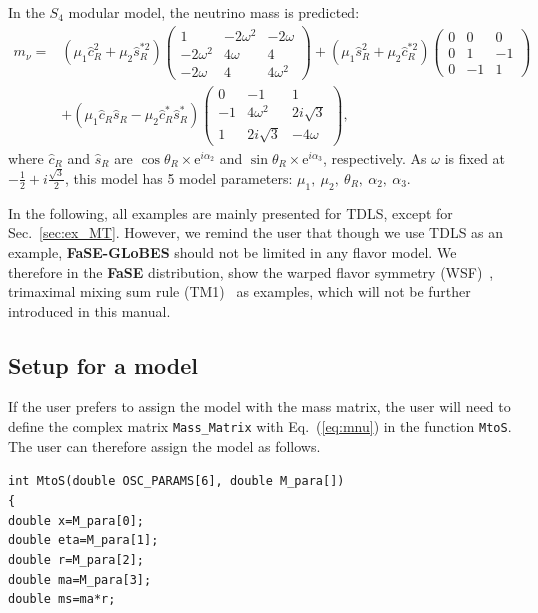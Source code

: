 \documentclass[aps,prd,nofootinbib,preprint]{revtex4}
\begin{document}
{\color{blue}In the $S_4$ modular model, the neutrino mass is predicted:
\begin{eqnarray}\label{eq:S4_mnu}
m_\nu=&(\mu_1\hat{c}_R^2+\mu_2\hat{s}_R^{*2})\left(
\begin{array}{ccc}
1& -2\omega^2& -2\omega\\
-2\omega^2&4\omega&4\\
-2\omega&4&4\omega^2
\end{array}
\right)+
(\mu_1\hat{s}^2_R+\mu_2\hat{c}_R^{*2})\left(
\begin{array}{ccc}
0& 0& 0\\
0&1&-1\\
0&-1&1
\end{array}
\right) \nonumber \\
&+(\mu_1\hat{c}_R\hat{s}_R-\mu_2\hat{c}^*_R\hat{s}_R^*)\left(
\begin{array}{ccc}
0& -1& 1\\
-1&4\omega^2&2i\sqrt{3}\\
1&2i\sqrt{3}&-4\omega
\end{array}
\right),
\end{eqnarray}
where $\hat{c}_R$ and $\hat{s}_R$ are $\cos\theta_R\times \mathrm{e}^{i\alpha_2}$ and $\sin\theta_R\times \mathrm{e}^{i\alpha_3}$, respectively. As $\omega$ is fixed at $-\frac{1}{2}+i\frac{\sqrt{3}}{2}$, this model has 5 model parameters: $\mu_1,~\mu_2,~\theta_R,~\alpha_2,~\alpha_3$.
}

{\color{blue}In the following, all examples are mainly presented for TDLS, except for Sec.~\ref{sec:ex_MT}. However, we remind the user that though we use TDLS as an example, \textbf{FaSE-GLoBES} should not be limited in any flavor model. We therefore in the \textbf{FaSE} distribution, show the warped flavor symmetry (WSF)~\cite{Chen:2015jta}, trimaximal mixing sum rule (TM1)~\cite{Albright:2008rp}  as examples, which will not be further introduced in this manual.
}

\subsection{Setup for a model}\label{sec:ex_set_model}

If the user prefers to assign the model with the mass matrix, the user will need to define the complex matrix \texttt{Mass\_Matrix} with Eq.~(\ref{eq:mnu}) in the function \texttt{MtoS}. The user can therefore assign the model as follows.

\texttt{int MtoS(double OSC\_PARAMS[6],~double M\_para[])}\\
\texttt{\{}
\\        
   \texttt{double x=M\_para[0];}\\
    \texttt{double eta=M\_para[1];}\\
    \texttt{double r=M\_para[2];}\\
    \texttt{double ma=M\_para[3];}\\
    \texttt{double ms=ma*r;}\\
    
\end{document}
